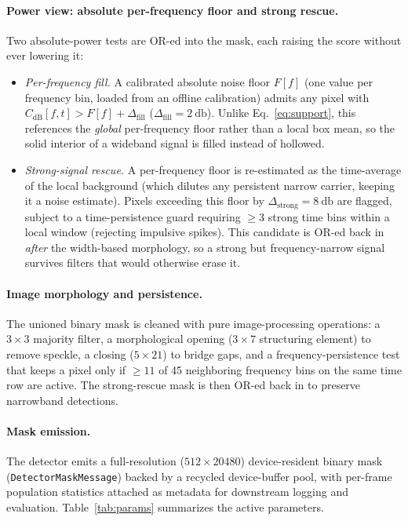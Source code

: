 \paragraph{Power view: absolute per-frequency floor and strong rescue.}
Two absolute-power tests are OR-ed into the mask, each raising the score without
ever lowering it:
\begin{itemize}
  \item \emph{Per-frequency fill.} A calibrated absolute noise floor
  $F[f]$ (one value per frequency bin, loaded from an offline calibration) admits
  any pixel with $C_{\text{dB}}[f,t] > F[f]+\Delta_{\text{fill}}$
  ($\Delta_{\text{fill}}=\SI{2}{\decibel}$). Unlike Eq.~\eqref{eq:support}, this
  references the \emph{global} per-frequency floor rather than a local box mean, so
  the solid interior of a wideband signal is filled instead of hollowed.
  \item \emph{Strong-signal rescue.} A per-frequency floor is re-estimated as the
  time-average of the local background (which dilutes any persistent narrow
  carrier, keeping it a noise estimate). Pixels exceeding this floor by
  $\Delta_{\text{strong}}=\SI{8}{\decibel}$ are flagged, subject to a
  time-persistence guard requiring $\ge\num{3}$ strong time bins within a local
  window (rejecting impulsive spikes). This candidate is OR-ed back in
  \emph{after} the width-based morphology, so a strong but frequency-narrow signal
  survives filters that would otherwise erase it.
\end{itemize}

\paragraph{Image morphology and persistence.}
The unioned binary mask is cleaned with pure image-processing operations: a
$3\times3$ majority filter, a morphological opening ($3\times7$ structuring
element) to remove speckle, a closing ($5\times21$) to bridge gaps, and a
frequency-persistence test that keeps a pixel only if $\ge\num{11}$ of \num{45}
neighboring frequency bins on the same time row are active. The
strong-rescue mask is then OR-ed back in to preserve narrowband detections.

\paragraph{Mask emission.}
The detector emits a full-resolution ($512\times20480$) device-resident binary
mask (\texttt{DetectorMaskMessage}) backed by a recycled device-buffer pool, with
per-frame population statistics attached as metadata for downstream logging and
evaluation. Table~\ref{tab:params} summarizes the active parameters.

